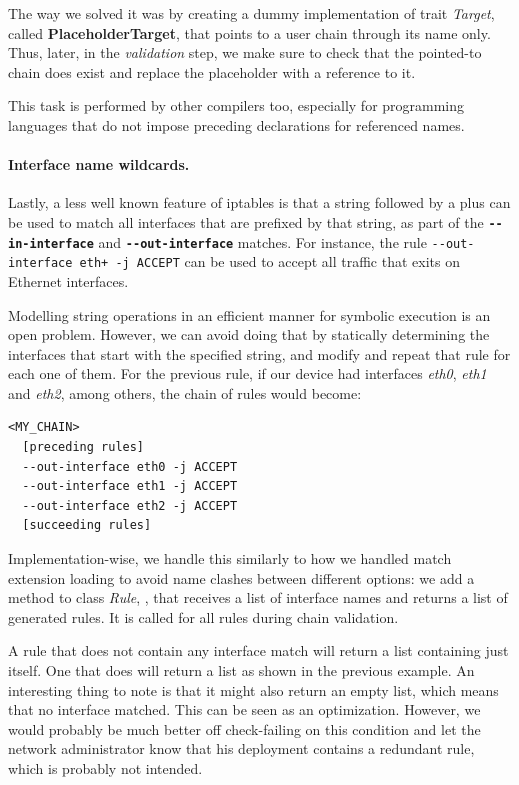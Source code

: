 The way we solved it was by creating a dummy implementation of trait
\emph{Target}, called \textbf{PlaceholderTarget}, that points to a user chain
through its name only.  Thus, later, in the \emph{validation} step, we make
sure to check that the pointed-to chain does exist and replace the placeholder
with a reference to it.

This task is performed by other compilers too, especially for programming
languages that do not impose preceding declarations for referenced names.

\paragraph{Interface name wildcards.}
Lastly, a less well known feature of iptables is that a string followed by a
plus can be used to match all interfaces that are prefixed by that string, as
part of the \textbf{\lstinline{--in-interface}} and
\textbf{\lstinline{--out-interface}} matches.  For instance, the rule
\lstinline{--out-interface eth+ -j ACCEPT} can be used to accept all traffic
that exits on Ethernet interfaces.

Modelling string operations in an efficient manner for symbolic execution is an
open problem.  However, we can avoid doing that by statically determining the
interfaces that start with the specified string, and modify and repeat that
rule for each one of them.  For the previous rule, if our device had
interfaces \emph{eth0}, \emph{eth1} and \emph{eth2}, among others, the chain of
rules would become:

\begin{listing}
  \lstset{numbers=none, frame=single, basicstyle=\ttfamily,
    xleftmargin=0.25\textwidth, xrightmargin=0.25\textwidth
  }
  \small
  \begin{lstlisting}
<MY_CHAIN>
  [preceding rules]
  --out-interface eth0 -j ACCEPT
  --out-interface eth1 -j ACCEPT
  --out-interface eth2 -j ACCEPT
  [succeeding rules]
  \end{lstlisting}
\end{listing}

Implementation-wise, we handle this similarly to how we handled match extension
loading to avoid name clashes between different options: we add a method to
class \emph{Rule}, , that
receives a list of interface names and returns a list of generated rules.  It
is called for all rules during chain validation.

A rule that does not contain any interface match will return a list containing
just itself.  One that does will return a list as shown in the previous
example.  An interesting thing to note is that it might also return an empty
list, which means that no interface matched.  This can be seen as an
optimization.  However, we would probably be much better off check-failing on
this condition and let the network administrator know that his deployment
contains a redundant rule, which is probably not intended.


